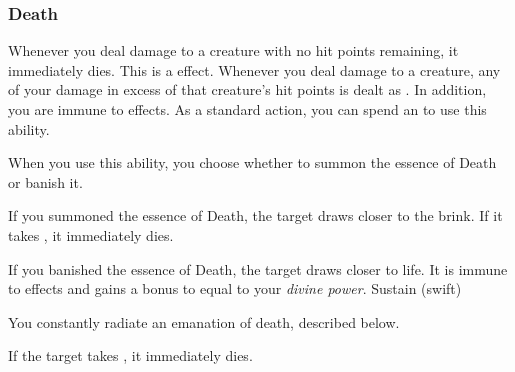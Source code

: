         \subsubsection{Death}
             Whenever you deal damage to a creature with no hit points remaining, it immediately dies.
            This is a  effect.
             Whenever you deal damage to a creature, any of your damage in excess of that creature's hit points is dealt as .
            In addition, you are immune to  effects.
             As a standard action, you can spend an  to use this ability.
            \begin{ability}
                \begin{spelltargetinginfo}
                    \spellspecial When you use this ability, you choose whether to summon the essence of Death or banish it.
                \end{spelltargetinginfo}
                \begin{spelleffects}
                    \spelleffect If you summoned the essence of Death, the target draws closer to the brink.
                    If it takes , it immediately dies.

                    If you banished the essence of Death, the target draws closer to life.
                    It is immune to  effects and gains a bonus to  equal to your \textit{divine power}.
                    \spelldur Sustain (swift)
                \end{spelleffects}
            \end{ability}
             You constantly radiate an emanation of death, described below.
            \begin{ability}
                \begin{spelltargetinginfo}
                \end{spelltargetinginfo}
                \begin{spelleffects}
                    \spelleffect If the target takes , it immediately dies.
                \end{spelleffects}
            \end{ability}

